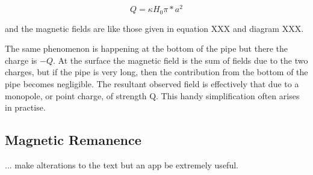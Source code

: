 \documentclass{article}
\begin{document}
\begin{equation}
Q= \kappa H_0 \pi*a^2
\end{equation}

and the magnetic fields are like those given in equation XXX and diagram XXX.

The same phenomenon is happening at the bottom of the pipe but there the charge is $-Q$. At the surface the magnetic field is the sum of fields due to the two charges, but if the pipe is very long, then the contribution from the bottom of the pipe becomes negligible. The resultant observed field is effectively that due to a monopole, or point charge, of strength Q.  This handy simplification often arises in practise.


\subsection{Magnetic Remanence}
... make alterations to the text but an app be extremely useful.
\end{document}
